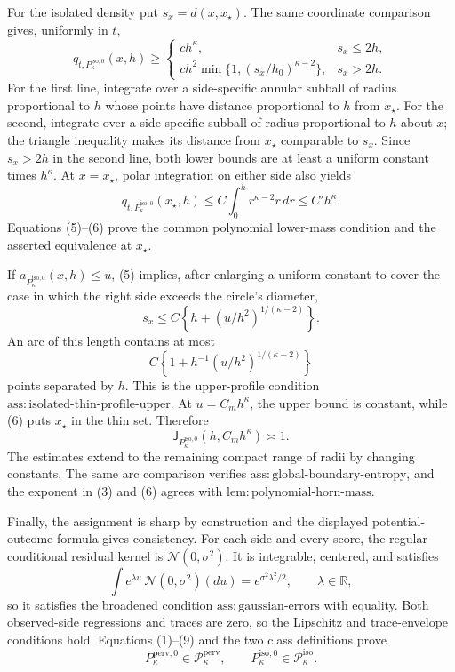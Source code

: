 For the isolated density put \(s_x=d(x,x_{\star})\).  The same coordinate comparison gives, uniformly in \(t\),
\[
 q_{t,P_{\kappa}^{\mathrm{iso},0}}(x,h)\ge
 \begin{cases}
 c h^{\kappa},&s_x\le2h,\\
 c h^2\min\{1,(s_x/h_0)^{\kappa-2}\},&s_x>2h.
 \end{cases} \tag{5}
\]
For the first line, integrate over a side-specific annular subball of radius proportional to \(h\) whose points have distance proportional to \(h\) from \(x_{\star}\).  For the second, integrate over a side-specific subball of radius proportional to \(h\) about \(x\); the triangle inequality makes its distance from \(x_{\star}\) comparable to \(s_x\).  Since \(s_x>2h\) in the second line, both lower bounds are at least a uniform constant times \(h^{\kappa}\).  At \(x=x_{\star}\), polar integration on either side also yields
\[
 q_{t,P_{\kappa}^{\mathrm{iso},0}}(x_{\star},h)
 \le C\int_0^h r^{\kappa-2}r\,dr
 \le C'h^{\kappa}. \tag{6}
\]
Equations (5)--(6) prove the common polynomial lower-mass condition and the asserted equivalence at \(x_{\star}\).

If \(a_{P_{\kappa}^{\mathrm{iso},0}}(x,h)\le u\), (5) implies, after enlarging a uniform constant to cover the case in which the right side exceeds the circle's diameter,
\[
 s_x\le C\left\{h+(u/h^2)^{1/(\kappa-2)}\right\}. \tag{7}
\]
An arc of this length contains at most
\[
 C\left\{1+h^{-1}(u/h^2)^{1/(\kappa-2)}\right\}
\]
points separated by \(h\).  This is the upper-profile condition \(\mathrm{ass:isolated\text{-}thin\text{-}profile\text{-}upper}\).  At \(u=C_mh^{\kappa}\), the upper bound is constant, while (6) puts \(x_{\star}\) in the thin set.  Therefore
\[
 \mathsf J_{P_{\kappa}^{\mathrm{iso},0}}(h,C_mh^{\kappa})\asymp1. \tag{8}
\]
The estimates extend to the remaining compact range of radii by changing constants.  The same arc comparison verifies \(\mathrm{ass:global\text{-}boundary\text{-}entropy}\), and the exponent in (3) and (6) agrees with \(\mathrm{lem:polynomial\text{-}horn\text{-}mass}\).

Finally, the assignment is sharp by construction and the displayed potential-outcome formula gives consistency.  For each side and every score, the regular conditional residual kernel is \(\mathcal N(0,\sigma^2)\).  It is integrable, centered, and satisfies
\[
 \int e^{\lambda u}\,\mathcal N(0,\sigma^2)(du)
 =e^{\sigma^2\lambda^2/2},\qquad \lambda\in\mathbb R, \tag{9}
\]
so it satisfies the broadened condition \(\mathrm{ass:gaussian\text{-}errors}\) with equality.  Both observed-side regressions and traces are zero, so the Lipschitz and trace-envelope conditions hold.  Equations (1)--(9) and the two class definitions prove
\[
 P_{\kappa}^{\mathrm{perv},0}\in\mathcal P_{\kappa}^{\mathrm{perv}},
 \qquad
 P_{\kappa}^{\mathrm{iso},0}\in\mathcal P_{\kappa}^{\mathrm{iso}}.
\]